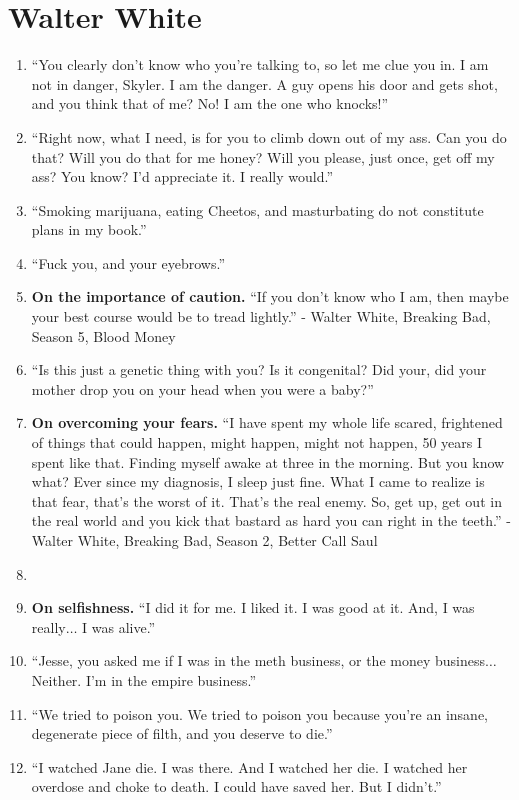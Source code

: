 \documentclass{book}
\numberwithin{equation}{section}
\begin{document}
\section{Walter White}
\begin{enumerate}
    \item ``You clearly don't know who you're talking to, so let me clue you in. I am not in danger, Skyler. I am the danger. A guy opens his door and gets shot, and you think that of me? No! I am the one who knocks!''
    \item ``Right now, what I need, is for you to climb down out of my ass. Can you do that? Will you do that for me honey? Will you please, just once, get off my ass? You know? I'd appreciate it. I really would.''
    \item ``Smoking marijuana, eating Cheetos, and masturbating do not constitute plans in my book.''
    \item ``Fuck you, and your eyebrows.''
    \item \textbf{On the importance of caution.} ``If you don't know who I am, then maybe your best course would be to tread lightly.'' - Walter White, Breaking Bad, Season 5, Blood Money
    \item ``Is this just a genetic thing with you? Is it congenital? Did your, did your mother drop you on your head when you were a baby?''
    \item \textbf{On overcoming your fears.} ``I have spent my whole life scared, frightened of things that could happen, might happen, might not happen, 50 years I spent like that. Finding myself awake at three in the morning. But you know what? Ever since my diagnosis, I sleep just fine. What I came to realize is that fear, that's the worst of it. That's the real enemy. So, get up, get out in the real world and you kick that bastard as hard you can right in the teeth.'' - Walter White, Breaking Bad, Season 2, Better Call Saul
    \item 
    \item \textbf{On selfishness.} ``I did it for me. I liked it. I was good at it. And, I was really$\ldots$ I was alive.''
    \item ``Jesse, you asked me if I was in the meth business, or the money business$\ldots$ Neither. I'm in the empire business.''
    \item ``We tried to poison you. We tried to poison you because you're an insane, degenerate piece of filth, and you deserve to die.''
    \item ``I watched Jane die. I was there. And I watched her die. I watched her overdose and choke to death. I could have saved her. But I didn't.''

\end{enumerate}
\end{document}
